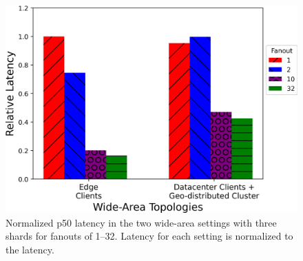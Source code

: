 \begin{figure}[tbp]
\centering
  \includegraphics[width=\columnwidth]{figs/wide_area_latencies.png}
  \vspace{1pt}
\caption{Normalized p50 latency in the two wide-area settings with three shards for fanouts of 1--32. Latency for each setting is normalized to the \mpaxos{} latency.}
\label{fig:wan}
\end{figure}




